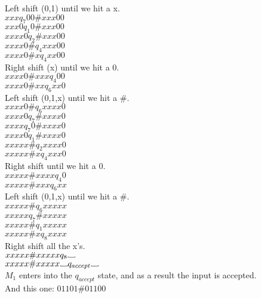 \documentclass[12pt]{article}
\newcommand\Vtextvisiblespace[1][.8em]{%
	\mbox{\kern.07em\vrule height.3ex}%
	\vbox{\hrule width#1}%
	\hbox{\vrule height.3ex}}
\begin{document}
Left shift (0,1) until we hit a x.        \\
$xxx                  q_7    00 \# xxx00$ \\
$xxx0                 q_1     0 \# xxx00$ \\
$xxxx0                q_2       \# xxx00$ \\
$xxxx0 \#             q_4          xxx00$ \\
$xxxx0 \# x           q_4           xx00$ \\
Right shift (x) until we hit a 0.         \\
$xxxx0 \# xxx         q_4             00$ \\
$xxxx0 \# xx          q_6            xx0$ \\
Left shift (0,1,x) until we hit a $\#$.  \\
$xxxx0 \#             q_6            xxxx0$ \\
$xxxx0                q_7        \#  xxxx0$ \\
$xxxx                 q_7      0 \#  xxxx0$ \\
$xxxx0                q_1        \#  xxxx0$ \\
$xxxxx \#             q_2            xxxx0$ \\
$xxxxx \# x           q_4             xxx0$ \\
Right shift until we hit a 0. \\
$xxxxx \# xxxx        q_4                0$ \\
$xxxxx \# xxx         q_6               xx$ \\
Left shift (0,1,x) until we hit a $\#$. \\
$xxxxx \#             q_6            xxxxx$ \\
$xxxxx                q_7        \#  xxxxx$ \\
$xxxxx \#             q_1            xxxxx$ \\
$xxxxx \# x           q_8             xxxx$ \\
Right shift all the x's. \\
$xxxxx \# xxxxx       q_8  \Vtextvisiblespace    $ \\
$xxxxx \# xxxxx  \Vtextvisiblespace  q_{accept} \Vtextvisiblespace $ \\
$M_1$ enters into the $q_{accept}$ state, and as a result the input is accepted. \\

\pagebreak
And this one: $01101\#01100$ \\
\end{document}
